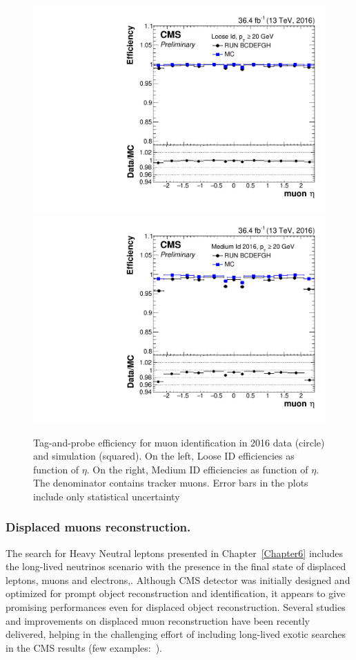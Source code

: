 \begin{figure}[h]
\centering
\includegraphics[width=.49\textwidth]{Figures/c2/TnP_MC_NUM_LooseID_DEN_genTracks_PAR_eta_.pdf}
\includegraphics[width=.49\textwidth]{Figures/c2/TnP_MC_NUM_MediumID2016_DEN_genTracks_PAR_eta_.pdf}
\caption{Tag-and-probe efficiency for muon identification in 2016 data
  (circle) and simulation (squared). On the left, Loose ID efficiencies as function of $\eta$. 
On the right, Medium ID efficiencies as function of $\eta$. The
  denominator contains tracker muons. Error bars in the plots include only statistical uncertainty~\cite{CMS-DP-2017-007}}
\label{fig:2016eff}
\end{figure}


\subsubsection{Displaced muons
  reconstruction.}\label{sec:c2muondisplaced}
The search for Heavy Neutral leptons presented in
Chapter~\ref{Chapter6} includes the long-lived neutrinos scenario with
the presence  in the final
state of displaced leptons, muons and electrons,. Although CMS detector was initially designed and optimized for prompt
object reconstruction and identification, it appears to give
promising performances even for displaced object
reconstruction. Several studies and improvements on displaced muon
reconstruction have been recently
delivered, helping in the challenging effort of including long-lived
exotic searches in the CMS results (few
examples:~\cite{cmscollaboration2021search, Sirunyan_2019ll,
  Sirunyan_2019ll2, Sirunyan_2020ll, Sirunyan_2021ll,CMS:2021tkn}).

